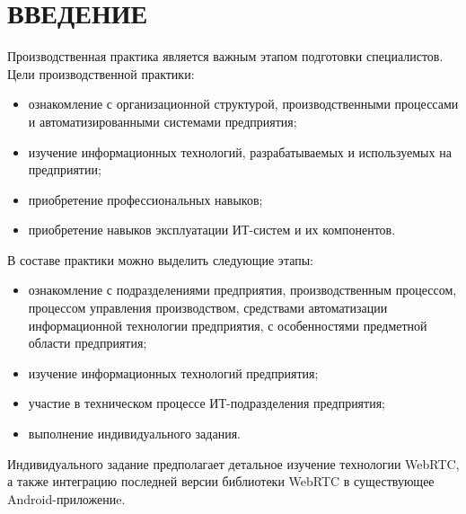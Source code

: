 \section*{ВВЕДЕНИЕ}

Производственная практика является важным этапом подготовки специалистов.
Цели производственной практики:
\begin{itemize}
\item ознакомление с организационной структурой, производственными процессами и
  автоматизированными системами предприятия;
\item изучение информационных технологий, разрабатываемых и используемых на предприятии;
\item приобретение профессиональных навыков;
\item приобретение навыков эксплуатации ИТ-систем и их компонентов.
\end{itemize}

В составе практики можно выделить следующие этапы:
\begin{itemize}
\item ознакомление с подразделениями предприятия, производственным процессом, 
  процессом управления производством, средствами автоматизации информационной технологии предприятия, 
  с особенностями предметной области предприятия;
\item изучение информационных технологий предприятия;
\item участие в техническом процессе ИТ-подразделения предприятия;
\item выполнение индивидуального задания.
\end{itemize}

Индивидуального задание предполагает детальное изучение технологии WebRTC,
а также интеграцию последней версии библиотеки WebRTC в существующее Android-приложениe.